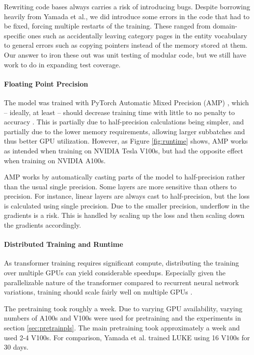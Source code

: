 \documentclass[main.tex]{subfiles}
\begin{document}
Rewriting code bases always carries a risk of introducing bugs.
Despite borrowing heavily from Yamada et al., we did introduce some errors in the code that had to be fixed, forcing multiple restarts of the training.
These ranged from domain-specific ones such as accidentally leaving category pages in the entity vocabulary to general errors such as copying pointers instead of the memory stored at them.
Our answer to iron these out was unit testing of modular code, but we still have work to do in expanding test coverage.

\paragraph{Floating Point Precision}
The model was trained with PyTorch Automatic Mixed Precision (AMP) \cite{pytorchamp}, which -- ideally, at least -- should decrease training time with little to no penalty to accuracy \cite{huang2020amp}.
This is partially due to half-precision calculations being simpler, and partially due to the lower memory requirements, allowing larger subbatches and thus better GPU utilization.
However, as Figure \ref{fig:runtime} shows, AMP works as intended when training on NVIDIA Tesla V100s, but had the opposite effect when training on NVIDIA A100s.

AMP works by automatically casting parts of the model to half-precision rather than the usual single precision.
Some layers are more sensitive than others to precision.
For instance, linear layers are always cast to half-precision, but the loss is calculated using single precision.
Due to the smaller precision, underflow in the gradients is a risk.
This is handled by scaling up the loss and then scaling down the gradients accordingly.
\cite{pytorchamp}

\paragraph{Distributed Training and Runtime}
As transformer training requires significant compute, distributing the training over multiple GPUs can yield considerable speedups.
Especially given the parallelizable nature of the transformer compared to recurrent neural network variations, training should scale fairly well on multiple GPUs \cite{vaswani2017att}.

The pretraining took roughly a week.
Due to varying GPU availability, varying numbers of A100s and V100s were used for pretraining and the experiments in section \ref{sec:pretrainpls}.
The main pretraining took approximately a week and used 2-4 V100s.
For comparison, Yamada et al. trained LUKE using 16 V100s for 30 days. \cite{yamada2020luke}
\end{document}
